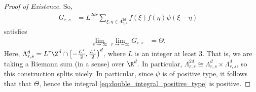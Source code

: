 \documentclass[10pt]{mypackage}
\begin{document}
\begin{proof}[Proof of Existence]
  So,
  \begin{align*}
    G_{r,s} &= L^{2dr} \sum_{\xi,\eta\in \Lambda^{2d}_{r,s}} \overline{f\left( \xi \right)}f\left( \eta \right)\psi\left( \xi-\eta \right)
  \end{align*}
  satisfies
  \begin{align*}
    \lim_{s\to\infty}\lim_{r\to-\infty} G_{r,s} &= \Theta.
  \end{align*}
  Here, $\Lambda^{d}_{r,s} = L^r\Z^d\cap \left[ -\frac{L^s}{2} , \frac{L^s}{2} \right)^{d}$, where $L$ is an integer at least $3$. That is, we are taking a Riemann sum (in a sense) over $\R^d$. In particular, $\Lambda^{2d}_{r,s} \cong \Lambda^{d}_{r,s}\times \Lambda^{d}_{r,s}$, so this construction splits nicely. In particular, since $\psi$ is of positive type, it follows that that $\Theta$, hence the integral \eqref{eq:double_integral_positive_type} is positive.


\end{proof}
\end{document}

